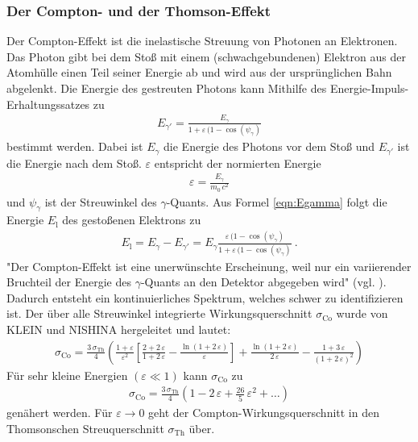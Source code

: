 \subsubsection{Der Compton- und der Thomson-Effekt}
Der Compton-Effekt ist die inelastische Streuung von Photonen an Elektronen. Das Photon gibt bei dem Stoß mit einem (schwachgebundenen) Elektron aus der Atomhülle einen Teil seiner Energie ab und wird aus der ursprünglichen Bahn abgelenkt. Die Energie des gestreuten Photons kann Mithilfe des Energie-Impuls-Erhaltungssatzes zu
\begin{align}
	E_{\gamma'} = \frac{E_{\gamma}}{1 + \varepsilon\,(1-\cos(\psi_{\gamma})}
	\label{eqn:Egamma}
\end{align}
bestimmt werden. Dabei ist $E_{\gamma}$ die Energie des Photons vor dem Stoß und $E_{\gamma'}$ ist die Energie nach dem Stoß. $\varepsilon$ entspricht der normierten Energie
\begin{align}
	\varepsilon = \frac{E_{\gamma}}{m_0\,c^2}
	\label{eqn:normEnergie}
\end{align}
und $\psi_{\gamma}$ ist der Streuwinkel des $\gamma$-Quants. Aus Formel \eqref{eqn:Egamma} folgt die Energie $E_\text{l}$ des gestoßenen Elektrons zu
\begin{align}
	E_\text{l} = E_{\gamma} - E_{\gamma'} = E_{\gamma} \frac{\varepsilon\,(1-\cos(\psi_{\gamma})}{1 + \varepsilon\,(1-\cos(\psi_{\gamma})} \ .
	\label{eqn:El}
\end{align}
"Der Compton-Effekt ist eine unerwünschte Erscheinung, weil nur ein variierender Bruchteil der Energie des $\gamma$-Quants an den Detektor abgegeben wird" (vgl. \cite[5]{V18}). Dadurch entsteht ein kontinuierliches Spektrum, welches schwer zu identifizieren ist. Der über alle Streuwinkel integrierte Wirkungsquerschnitt $\sigma_\text{Co}$ wurde von KLEIN und NISHINA hergeleitet und lautet:
\begin{align}
	\sigma_\text{Co} = \frac{3\,\sigma_\text{Th}}{4} \left( \frac{1+\varepsilon}{\varepsilon^2} \left[\frac{2+2\,\varepsilon}{1+2\,\varepsilon} - \frac{\ln(1+2\,\varepsilon)}{\varepsilon} \right] + \frac{\ln(1+2\,\varepsilon)}{2\,\varepsilon} - \frac{1+3\,\varepsilon}{(1+2\,\varepsilon)^2} \right)
\end{align}
Für sehr kleine Energien $(\varepsilon \ll 1)$ kann $\sigma_\text{Co}$ zu
\begin{align}
	\sigma_\text{Co} = \frac{3\,\sigma_\text{Th}}{4} \left(1 - 2\,\varepsilon + \frac{26}{5}\,\varepsilon^2 + \dots \right)
\end{align}
genähert werden. Für $\varepsilon \rightarrow 0$ geht der Compton-Wirkungsquerschnitt in den Thomsonschen Streuquerschnitt $\sigma_\text{Th}$ über.
